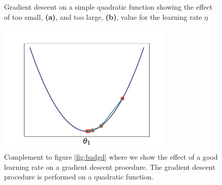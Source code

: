 \begin{figure}[h]
\centering
\hspace*{-0.9in}
\caption[Sub-optimal gradient descent]{Gradient descent on a simple quadratic function showing the effect of too small, \textbf{(a)}, and too large, \textbf{(b)}, value for the learning rate $\eta$}\label{fig:badgd}
\includegraphics[width=0.75\textwidth]{../figures/gd_good.pdf}
\caption[Optimal gradient descent]{Complement to figure \ref{fig:badgd} where we show the effect of a good learning rate on a gradient descent procedure. The gradient descent procedure is performed on a quadratic function.}\label{fig:goodgd}
\end{figure}


